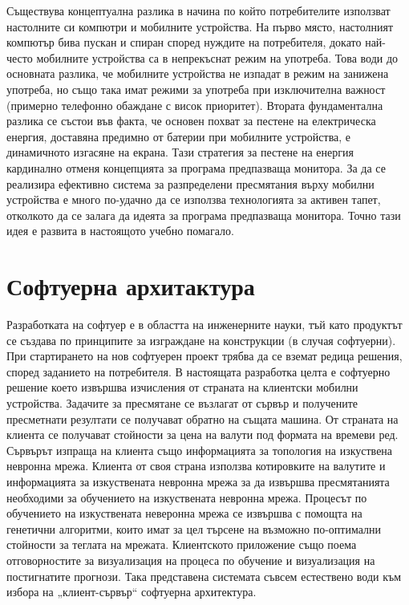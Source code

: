 \documentclass[book,14pt,oneside,openany]{memoir}
\begin{document}
Съществува концептуална разлика в начина по който потребителите използват настолните си компютри и мобилните устройства. На първо място, настолният компютър бива пускан и спиран според нуждите на потребителя, докато най-често мобилните устройства са в непрекъснат режим на употреба. Това води до основната разлика, че мобилните устройства не изпадат в режим на занижена употреба, но също така имат режими за употреба при изключителна важност (примерно телефонно обаждане с висок приоритет). Втората фундаментална разлика се състои във факта, че основен похват за пестене на електрическа енергия, доставяна предимно от батерии при мобилните устройства, е динамичното изгасяне на екрана. Тази стратегия за пестене на енергия кардинално отменя концепцията за програма предпазваща монитора. За да се реализира ефективно система за разпределени пресмятания върху мобилни устройства е много по-удачно да се използва технологията за активен тапет, отколкото да се залага да идеята за програма предпазваща монитора. Точно тази идея е развита в настоящото учебно помагало. 

\newpage
\chapter{Софтуерна архитактура}
\label{chapter03}

Разработката на софтуер е в областта на инженерните науки, тъй като продуктът се създава по принципите за изграждане на конструкции (в случая софтуерни). При стартирането на нов софтуерен проект трябва да се вземат редица решения, според заданието на потребителя. В настоящата разработка целта е софтуерно решение което извършва изчисления от страната на клиентски мобилни устройства. Задачите за пресмятане се възлагат от сървър и получените пресметнати резултати се получават обратно на същата машина. От страната на клиента се получават стойности за цена на валути под формата на времеви ред. Сървърът изпраща на клиента също информацията за топология на изкуствена невронна мрежа. Клиента от своя страна използва котировките на валутите и информацията за изкуствената невронна мрежа за да извършва пресмятанията необходими за обучението на изкуствената невронна мрежа. Процесът по обучението на изкуствената неверонна мрежа се извършва с помощта на генетични алгоритми, които имат за цел търсене на възможно по-оптимални стойности за теглата на мрежата. Клиентското приложение също поема отговорностите за визуализация на процеса по обучение и визуализация на постигнатите прогнози. Така представена системата съвсем естествено води към избора на „клиент-сървър“ софтуерна архитектура. 
\end{document}
